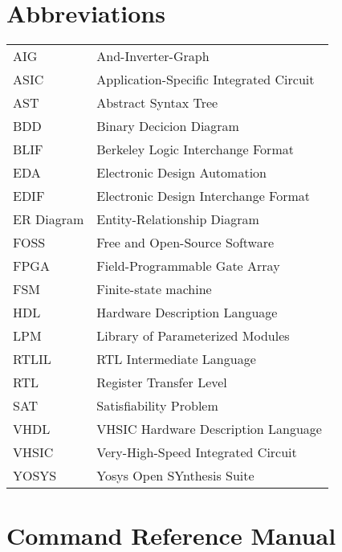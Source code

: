 \documentclass[oneside,a4paper]{book}
\begin{document}
\chapter*{Abbreviations}
\begin{tabular}{ll}
AIG         & And-Inverter-Graph \\
ASIC        & Application-Specific Integrated Circuit \\
AST         & Abstract Syntax Tree \\
BDD         & Binary Decicion Diagram \\
BLIF        & Berkeley Logic Interchange Format \\
EDA         & Electronic Design Automation \\
EDIF        & Electronic Design Interchange Format \\
ER Diagram  & Entity-Relationship Diagram \\
FOSS        & Free and Open-Source Software \\
FPGA        & Field-Programmable Gate Array \\
FSM         & Finite-state machine \\
HDL         & Hardware Description Language \\
LPM         & Library of Parameterized Modules \\
RTLIL       & RTL Intermediate Language \\
RTL         & Register Transfer Level \\
SAT         & Satisfiability Problem \\
VHDL        & VHSIC Hardware Description Language \\
VHSIC       & Very-High-Speed Integrated Circuit \\
YOSYS       & Yosys Open SYnthesis Suite \\
\end{tabular}

\tableofcontents











% 

\appendix




\chapter{Command Reference Manual}
\label{commandref}



% 




\end{document}
